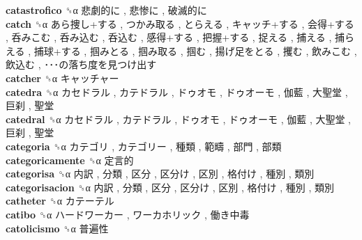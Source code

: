 \textbf{catastrofico} ␝α   悲劇的に ,  悲惨に ,  破滅的に   \\
\textbf{catch} ␝α   あら捜し+する ,  つかみ取る ,  とらえる ,  キャッチ+する ,  会得+する ,  呑みこむ ,  呑み込む ,  呑込む ,  感得+する ,  把握+する ,  捉える ,  捕える ,  捕らえる ,  捕球+する ,  掴みとる ,  掴み取る ,  掴む ,  揚げ足をとる ,  攫む ,  飲みこむ ,  飲込む ,  ･･･の落ち度を見つけ出す   \\
\textbf{catcher} ␝α   キャッチャー   \\
\textbf{catedra} ␝α   カセドラル ,  カテドラル ,  ドゥオモ ,  ドゥオーモ ,  伽藍 ,  大聖堂 ,  巨刹 ,  聖堂   \\
\textbf{catedral} ␝α   カセドラル ,  カテドラル ,  ドゥオモ ,  ドゥオーモ ,  伽藍 ,  大聖堂 ,  巨刹 ,  聖堂   \\
\textbf{categoria} ␝α   カテゴリ ,  カテゴリー ,  種類 ,  範疇 ,  部門 ,  部類   \\
\textbf{categoricamente} ␝α   定言的   \\
\textbf{categorisa} ␝α   内訳 ,  分類 ,  区分 ,  区分け ,  区別 ,  格付け ,  種別 ,  類別   \\
\textbf{categorisacion} ␝α   内訳 ,  分類 ,  区分 ,  区分け ,  区別 ,  格付け ,  種別 ,  類別   \\
\textbf{catheter} ␝α   カテーテル   \\
\textbf{catibo} ␝α   ハードワーカー ,  ワーカホリック ,  働き中毒   \\
\textbf{catolicismo} ␝α   普遍性   \\
